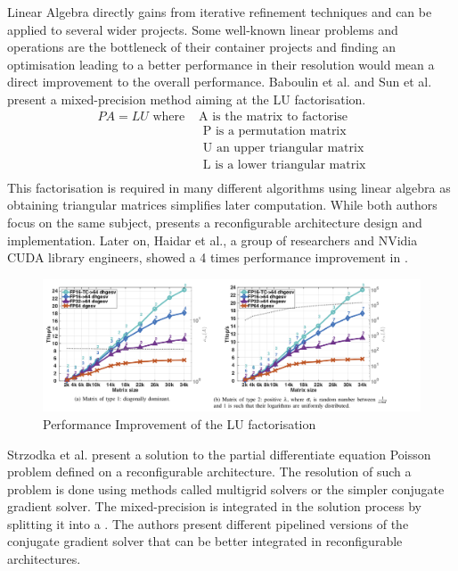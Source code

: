 Linear Algebra directly gains from iterative refinement techniques and can be applied to several wider projects. Some well-known linear problems and operations are the bottleneck of their container projects and finding an optimisation leading to a better performance in their resolution would mean a direct improvement to the overall performance. Baboulin et al. \cite{Baboulin2009} and Sun et al. \cite{Sun2008} present a mixed-precision method aiming at the LU factorisation.
\begin{align}
  PA=LU \textrm{ where } & \textrm{A is the matrix to factorise} \\
        & \textrm{ P is a permutation matrix} \\
        & \textrm{ U an upper triangular matrix} \\
        & \textrm{ L is a lower triangular matrix} \\
\end{align}
This factorisation is required in many different algorithms using linear algebra as obtaining triangular matrices simplifies later computation. While both authors focus on the same subject, \cite{Sun2008} presents a reconfigurable architecture design and implementation. Later on, Haidar et al., a group of researchers and NVidia CUDA library engineers, showed a 4 times performance improvement in \cite{Haidar2018}.

\begin{figure}[htbp]
	\centering
		\includegraphics[width=16cm]{Figures/HaidarPerf.png}
	\caption[Performance Improvement]{Performance Improvement of the LU factorisation \cite{Haidar2018}}
	\label{fig:HaidarPerf}
\end{figure}

Strzodka et al. \cite{Strzodka2006} present a solution to the partial differentiate equation Poisson problem defined on a reconfigurable architecture. The resolution of such a problem is done using methods called multigrid solvers or the simpler conjugate gradient solver. The mixed-precision is integrated in the solution process by splitting it into a . The authors present different pipelined versions of the conjugate gradient solver that can be better integrated in reconfigurable architectures.

